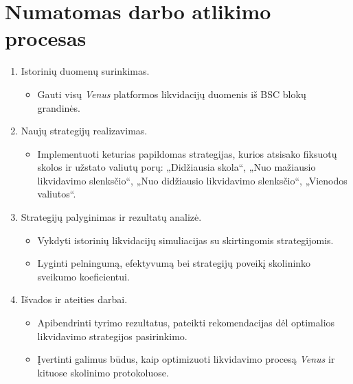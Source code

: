 \documentclass[]{VUMIFTemplateClass}
\begin{document}
\section{Numatomas darbo atlikimo procesas}

\begin{enumerate}
  \item Istorinių duomenų surinkimas.
   \begin{itemize}
    \item Gauti visų \textit{Venus} platformos likvidacijų duomenis iš BSC blokų grandinės.
  \end{itemize}

  \item Naujų strategijų realizavimas.
   \begin{itemize}
    \item Implementuoti keturias papildomas strategijas, kurios atsisako fiksuotų skolos ir užstato valiutų porų: „Didžiausia skola“, „Nuo mažiausio likvidavimo slenksčio“, „Nuo didžiausio likvidavimo slenksčio“, „Vienodos valiutos“.
  \end{itemize}

  \item Strategijų palyginimas ir rezultatų analizė.
  \begin{itemize}
   \item Vykdyti istorinių likvidacijų simuliacijas su skirtingomis strategijomis.
   \item Lyginti pelningumą, efektyvumą bei strategijų poveikį skolininko sveikumo koeficientui.
  \end{itemize}

  \item Išvados ir ateities darbai.
  \begin{itemize}
   \item Apibendrinti tyrimo rezultatus, pateikti rekomendacijas dėl optimalios likvidavimo strategijos pasirinkimo.
   \item Įvertinti galimus būdus, kaip optimizuoti likvidavimo procesą \textit{Venus} ir kituose skolinimo protokoluose.
  \end{itemize}

\end{enumerate}

\nocite{*}

\printbibliography[title = {Literatūra ir šaltiniai}]
\end{document}

